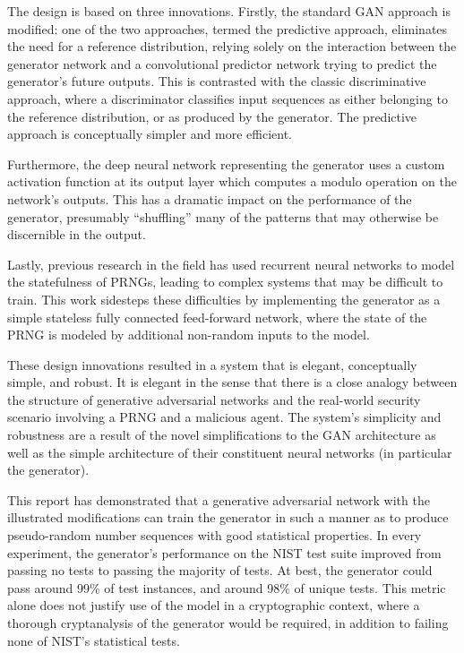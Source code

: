 \documentclass[12pt, titlepage]{report}
\theoremstyle{definition}
\begin{document}
{The design is based on three innovations. Firstly, the standard GAN approach is modified: one of the two approaches, termed the predictive approach, eliminates the need for a reference distribution, relying  solely on the interaction between the generator network and a convolutional predictor network trying to predict the generator's future outputs. This is contrasted with the classic discriminative approach, where a discriminator classifies input sequences as either belonging to the reference distribution, or as produced by the generator. The predictive approach is conceptually simpler and more efficient.

Furthermore, the deep neural network representing the generator uses a custom activation function at its output layer which computes a modulo operation on the network's outputs. This has a dramatic impact on the performance of the generator, presumably ``shuffling'' many of the patterns that may otherwise be discernible in the output.

Lastly, previous research in the field has used recurrent neural networks to model the statefulness of PRNGs, leading to complex systems that may be difficult to train. This work sidesteps these difficulties by implementing the generator as a simple stateless fully connected feed-forward network, where the state of the PRNG is modeled by additional non-random inputs to the model.

These design innovations resulted in a system that is elegant, conceptually simple, and robust. It is elegant in the sense that there is a close analogy between the structure of generative adversarial networks and the real-world security scenario involving a PRNG and a malicious agent. The system's simplicity and robustness are a result of the novel simplifications to the GAN architecture as well as the simple architecture of their constituent neural networks (in particular the generator).

This report has demonstrated that a generative adversarial network with the illustrated modifications can train the generator in such a manner as to produce pseudo-random number sequences with good statistical properties. In every experiment, the generator's performance on the NIST test suite improved from passing no tests to passing the majority of tests. At best, the generator could pass around 99\% of test instances, and around 98\% of unique tests. This metric alone does not justify use of the model in a cryptographic context, where a thorough cryptanalysis of the generator would be required, in addition to failing none of NIST's statistical tests.

}
\end{document}
